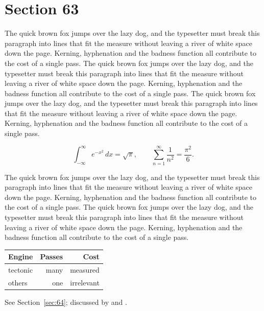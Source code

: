 \documentclass{article}
\begin{document}
\section{Section 63}
\label{sec:63}
The quick brown fox jumps over the lazy dog, and the typesetter must break this paragraph into lines that fit the measure without leaving a river of white space down the page. Kerning, hyphenation and the badness function all contribute to the cost of a single pass. The quick brown fox jumps over the lazy dog, and the typesetter must break this paragraph into lines that fit the measure without leaving a river of white space down the page. Kerning, hyphenation and the badness function all contribute to the cost of a single pass. The quick brown fox jumps over the lazy dog, and the typesetter must break this paragraph into lines that fit the measure without leaving a river of white space down the page. Kerning, hyphenation and the badness function all contribute to the cost of a single pass. 

\begin{equation}\label{eq:63}
\int_{-\infty}^{\infty} e^{-x^{2}}\,dx = \sqrt{\pi}, \qquad
\sum_{n=1}^{\infty} \frac{1}{n^{2}} = \frac{\pi^{2}}{6}.
\end{equation}

The quick brown fox jumps over the lazy dog, and the typesetter must break this paragraph into lines that fit the measure without leaving a river of white space down the page. Kerning, hyphenation and the badness function all contribute to the cost of a single pass. The quick brown fox jumps over the lazy dog, and the typesetter must break this paragraph into lines that fit the measure without leaving a river of white space down the page. Kerning, hyphenation and the badness function all contribute to the cost of a single pass. 

\begin{center}
\begin{tabular}{lrr}
\toprule
Engine & Passes & Cost \\
\midrule
tectonic & many & measured \\
others & one & irrelevant \\
\bottomrule
\end{tabular}
\end{center}

See Section~\ref{sec:64}; discussed by \textcite{k4} and \textcite{l1}.
\end{document}
